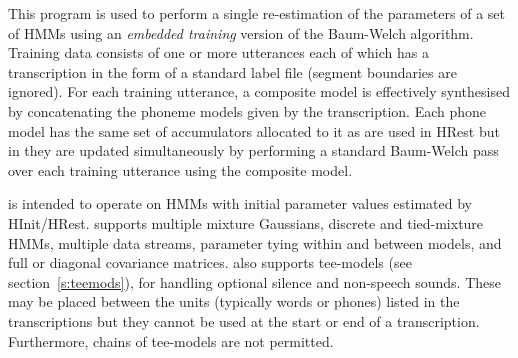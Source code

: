 %
%

\newpage
{}


This program is used to perform a single re-estimation of
the parameters of a set of HMMs using an {\em embedded training} version 
of the Baum-Welch algorithm.  Training
data consists of one or more utterances each of which has a 
transcription in the form of a standard label file (segment
boundaries are ignored).  For each training utterance, a
composite model is effectively synthesised by concatenating
the phoneme models given by the transcription.  Each phone
model has the same set of accumulators allocated to it as are
used in HRest but in  they
are updated simultaneously by performing a standard Baum-Welch pass over
each training utterance using the composite model. 
  
 is intended to operate on HMMs with initial parameter values 
estimated by HInit/HRest.
 supports multiple mixture Gaussians, discrete and tied-mixture
HMMs, multiple data streams, parameter tying within and between models, and
full or diagonal covariance matrices.  also supports tee-models
(see section~\ref{s:teemods}), for handling optional silence and non-speech
sounds. These may be placed between the units (typically words or phones)
listed in the transcriptions but they cannot be used at the start or end of a
transcription. Furthermore, chains of tee-models are not permitted.

